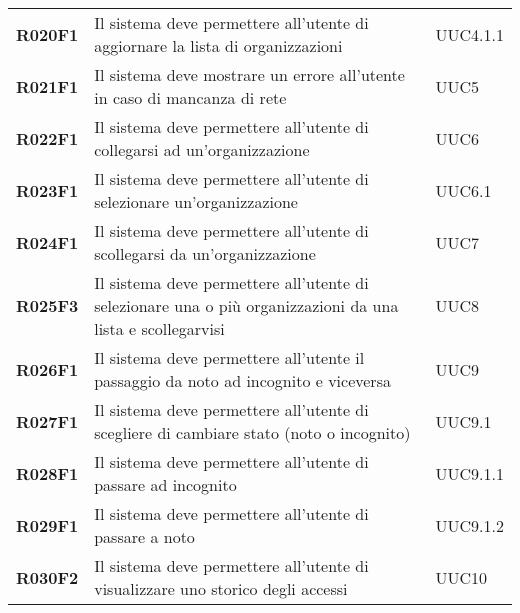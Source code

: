 \documentclass[../analisi-dei-requisiti.tex]{subfiles}
\begin{document}
\begin{longtable}[H]{>{\centering\bfseries}m{3cm} >{\centering}m{10cm} >{\centering\arraybackslash}m{3cm}}
  R020F1                  & Il sistema deve permettere all'utente di aggiornare la lista di organizzazioni                                                                 & UUC4.1.1                      \\
  R021F1                  & Il sistema deve mostrare un errore all'utente in caso di mancanza di rete                                                                      & UUC5                          \\
  R022F1                  & Il sistema deve permettere all'utente di collegarsi ad un'organizzazione                                                                       & UUC6                          \\
  R023F1                  & Il sistema deve permettere all'utente di selezionare un'organizzazione                                                                         & UUC6.1                        \\
  R024F1                  & Il sistema deve permettere all'utente di scollegarsi da un'organizzazione                                                                      & UUC7                          \\
  R025F3                  & Il sistema deve permettere all'utente di selezionare una o più organizzazioni da una lista e scollegarvisi                                     & UUC8                          \\
  R026F1                  & Il sistema deve permettere all'utente il passaggio da noto ad incognito e viceversa                                                            & UUC9                          \\
  R027F1                  & Il sistema deve permettere all'utente di scegliere di cambiare stato (noto o incognito)                                                        & UUC9.1                        \\
  R028F1                  & Il sistema deve permettere all'utente di passare ad incognito                                                                                  & UUC9.1.1                      \\
  R029F1                  & Il sistema deve permettere all'utente di passare a noto                                                                                        & UUC9.1.2                      \\
  R030F2                  & Il sistema deve permettere all'utente di visualizzare uno storico degli accessi                                                                & UUC10                         \\

\end{longtable}
\end{document}
